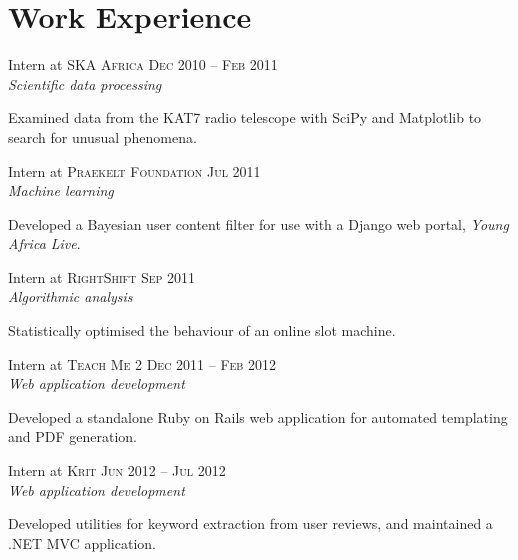 \documentclass[a4paper,10pt]{article} %
\begin{document}
\begin{minipage}[t]{0.5\textwidth}
\section{Work Experience} 


{\raggedright{\large Intern at \textsc{SKA Africa}} \hfill \textsc{Dec 2010 -- Feb 2011}\\
\textit{Scientific data processing}\\[5pt]}

Examined data from the KAT7 radio telescope with SciPy and Matplotlib to search for unusual phenomena.\\


{\raggedright{\large Intern at \textsc{Praekelt Foundation}} \hfill \textsc{Jul 2011}\\
\textit{Machine learning}\\[5pt]}

Developed a Bayesian user content filter for use with a Django web portal, \emph{Young Africa Live}.\\


{\raggedright{\large Intern at \textsc{RightShift}} \hfill \textsc{Sep 2011}\\
\textit{Algorithmic analysis}\\[5pt]}

Statistically optimised the behaviour of an online slot machine.\\


{\raggedright{\large Intern at \textsc{Teach Me 2}} \hfill \textsc{Dec 2011 -- Feb 2012}\\
\textit{Web application development}\\[5pt]}

Developed a standalone Ruby on Rails web application for automated templating and PDF generation.\\


{\raggedright{\large Intern at \textsc{Krit}} \hfill \textsc{Jun 2012 -- Jul 2012}\\
\textit{Web application development}\\[5pt]}

Developed utilities for keyword extraction from user reviews, and maintained a .NET MVC application.\\


\end{minipage} %
\end{document}
